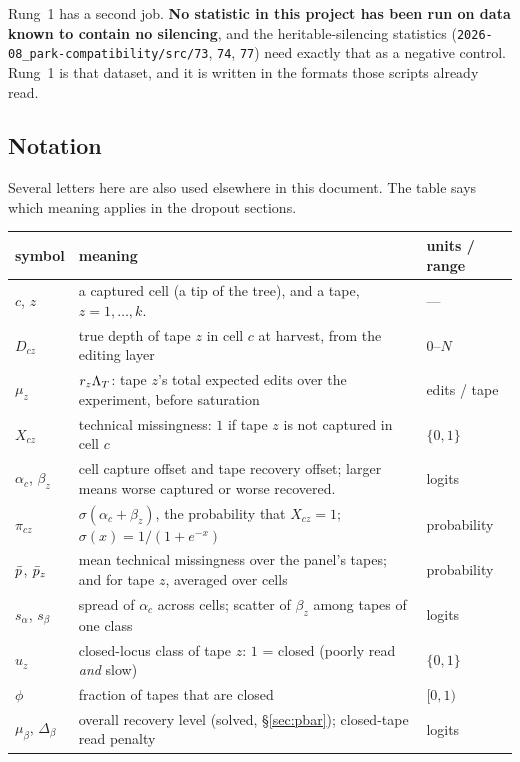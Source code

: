 Rung~1 has a second job. \textbf{No statistic in this project has been run on data known to contain
no silencing}, and the heritable-silencing statistics
(\texttt{2026-08\_park-compatibility/src/73}, \texttt{74}, \texttt{77}) need exactly that as a negative
control. Rung~1 is that dataset, and it is written in the formats those scripts already read.

\subsection*{Notation}

Several letters here are also used elsewhere in this document. The table says which meaning applies
in the dropout sections.

\begin{center}\small
\begin{tabular}{@{}lp{}l@{}}
\toprule
symbol & meaning & units / range \\
\midrule
$c$, $z$ & a captured cell (a tip of the tree), and a tape, $z=1,\dots,k$. & --- \\
$D_{cz}$ & true depth of tape $z$ in cell $c$ at harvest, from the editing layer & $0$--$N$ \\
$\mu_z$ & $r_z\Lambda_T$: tape $z$'s total expected edits over the experiment, before saturation & edits / tape \\
$X_{cz}$ & technical missingness: $1$ if tape $z$ is not captured in cell $c$ & $\{0,1\}$ \\
$\alpha_c$, $\beta_z$ & cell capture offset and tape recovery offset; larger means worse captured or
      worse recovered. & logits \\
$\pi_{cz}$ & $\sigma(\alpha_c+\beta_z)$, the probability that $X_{cz}=1$;
      $\sigma(x)=1/(1+e^{-x})$ & probability \\
$\bar p$, $\bar p_z$ & mean technical missingness over the panel's tapes; and for tape $z$, averaged
      over cells & probability \\
$s_\alpha$, $s_\beta$ & spread of $\alpha_c$ across cells; scatter of $\beta_z$ among tapes of one
      class & logits \\
$u_z$ & closed-locus class of tape $z$: $1$ = closed (poorly read \emph{and} slow) & $\{0,1\}$ \\
$\phi$ & fraction of tapes that are closed & $[0,1)$ \\
$\mu_\beta$, $\Delta_\beta$ & overall recovery level (solved, \S\ref{sec:pbar}); closed-tape read
      penalty & logits \\

\end{tabular}
\end{center}
